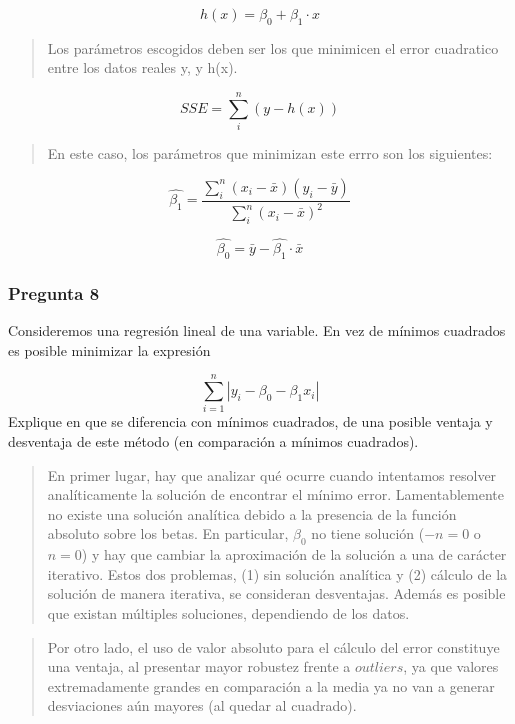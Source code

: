 \documentclass[]{article}
\begin{document}
\[
h(x) = \beta_{0} + \beta_{1} \cdot x
\]

\begin{quote}
Los parámetros escogidos deben ser los que minimicen el error cuadratico
entre los datos reales y, y h(x).
\end{quote}

\[
SSE = \sum_{i}^{n}(y - h(x))
\]

\begin{quote}
En este caso, los parámetros que minimizan este errro son los
siguientes:
\end{quote}

\[
\hat{\beta_{1}} = \frac{\sum_{i}^{n}(x_i - \bar{x}) (y_i - \bar{y})}{\sum_{i}^{n}(x_i - \bar{x})^2}
\]

\[
\hat{\beta_{0}} = \bar{y} - \hat{\beta_{1}} \cdot \bar{x}
\]

\hypertarget{pregunta-8}{%
\subsubsection{\texorpdfstring{\textbf{Pregunta
8}}{Pregunta 8}}\label{pregunta-8}}

Consideremos una regresión lineal de una variable. En vez de mínimos
cuadrados es posible minimizar la expresión

\[
\displaystyle{\sum_{i=1}^{n}}|y_{i}-\beta_{0}-\beta_{1}x_{i}|
\] Explique en que se diferencia con mínimos cuadrados, de una posible
ventaja y desventaja de este método (en comparación a mínimos
cuadrados).

\begin{quote}
En primer lugar, hay que analizar qué ocurre cuando intentamos resolver
analíticamente la solución de encontrar el mínimo error. Lamentablemente
no existe una solución analítica debido a la presencia de la función
absoluto sobre los betas. En particular, \(\beta_0\) no tiene solución
(\(-n = 0\) o\(n = 0\)) y hay que cambiar la aproximación de la solución
a una de carácter iterativo. Estos dos problemas, (1) sin solución
analítica y (2) cálculo de la solución de manera iterativa, se
consideran desventajas. Además es posible que existan múltiples
soluciones, dependiendo de los datos.
\end{quote}

\begin{quote}
Por otro lado, el uso de valor absoluto para el cálculo del error
constituye una ventaja, al presentar mayor robustez frente a
\(\textit{outliers}\), ya que valores extremadamente grandes en
comparación a la media ya no van a generar desviaciones aún mayores (al
quedar al cuadrado).
\end{quote}
\end{document}
